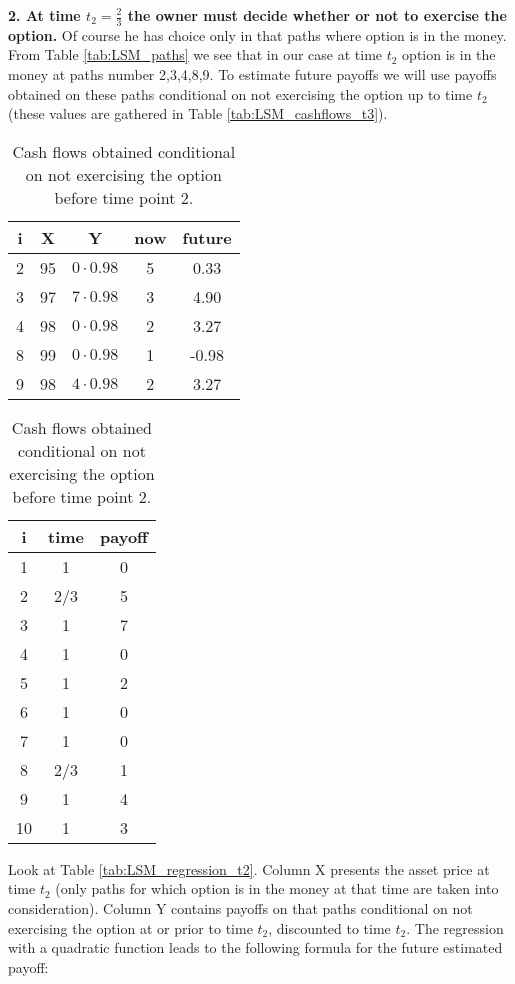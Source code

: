\documentclass[a4paper,12pt, oneside]{book}
\theoremstyle{definition}
\theoremstyle{remark}
\begin{document}
\FloatBarrier
\noindent \textbf{2. At time $t_2 = \frac{2}{3}$ the owner must decide whether or not to exercise the option.} Of course he has choice only in that paths where option is in the money. From Table \ref{tab:LSM_paths} we see that in our case at time $t_2$ option is in the money at paths number 2,3,4,8,9. To estimate future payoffs we will use payoffs obtained on these paths conditional on not exercising the option up to time $t_2$ (these values are gathered in Table \ref{tab:LSM_cashflows_t3}).

\begin{table}[!ht]
\parbox{.45\linewidth} {
  \centering
  \caption{Estimating future payoffs at time point 2.}
  \label{tab:LSM_regression_t2}
  \begin{tabular} {||c |c |c || c | c ||}  
  \hline 
    i & X   &  Y  & now   &  future\\ \hline \hline
    2 & 95 & $0\cdot 0.98$ & 5 & 0.33 \\ \hline
    3 & 97 & $7\cdot 0.98$ & 3 & 4.90  \\ \hline
    4 & 98 & $0\cdot 0.98$ & 2 & 3.27 \\ \hline
    8 & 99 & $0\cdot 0.98$ & 1 & -0.98 \\ \hline
    9 & 98 & $4\cdot 0.98$ & 2 & 3.27 \\ \hline
  \end{tabular}
}
\qquad
\parbox{.45\linewidth} {
  \centering
  \caption{Cash flows obtained conditional on not exercising the option before time point 2.}
  \label{tab:LSM_cashflows_t2}
  \begin{tabular}{||c|c|c||}
  \hline 
  i  & time  &  payoff \\ \hline \hline
  1  & 1     &      0 \\ \hline
  2  & 2/3   &      5 \\ \hline
  3  & 1     &      7 \\ \hline
  4  & 1     &      0 \\ \hline
  5  & 1     &      2 \\ \hline
  6  & 1     &      0 \\ \hline
  7  & 1     &      0 \\ \hline
  8  & 2/3   &      1 \\ \hline
  9  & 1     &      4 \\ \hline
  10  & 1     &      3 \\ \hline
  \end{tabular}
}
\end{table}
Look at Table \ref{tab:LSM_regression_t2}. Column X presents the asset price at time $t_2$ (only paths for which option is in the money at that time are taken into consideration). Column Y contains payoffs on that paths conditional on not exercising the option at or prior to time $t_2$, discounted to time $t_2$. The regression with a quadratic function leads to the following formula for the future estimated payoff:
\end{document}
